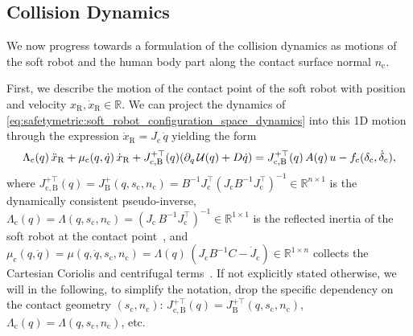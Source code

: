\subsection{Collision Dynamics}
We now progress towards a formulation of the collision dynamics as motions of the soft robot and the human body part along the contact surface normal $n_\mathrm{c}$.

First, we describe the motion of the contact point of the soft robot with position and velocity $x_\mathrm{R}, \dot{x}_\mathrm{R} \in \mathbb{R}$.
We can project the dynamics of \eqref{eq:safetymetric:soft_robot_configuration_space_dynamics} into this 1D motion through the expression $\dot{x}_\mathrm{R} = J_\mathrm{c} \, \dot{q}$ yielding the form~\citep{khatib1987unified, della2019exact, della2020model, stolzle2024guiding}
\begin{equation}
    \Lambda_\mathrm{c}(q) \, \Ddot{x}_\mathrm{R} + \mu_\mathrm{c}(q,\dot{q}) \, \dot{x}_\mathrm{R} + J_\mathrm{c,B}^{+\top}(q) ( \partial_{q} \, \mathcal{U}(q) + D \dot{q} ) = J_\mathrm{c,B}^{+\top}(q) \, A(q) \, u - f_{\mathrm{c}}(\delta_\mathrm{c}, \dot{\delta}_\mathrm{c}),
\end{equation}
where $J_\mathrm{c,B}^{+\top}(q) = J_\mathrm{B}^+(q,s_\mathrm{c},n_\mathrm{c}) = B^{-1}J_\mathrm{c}^\top(J_\mathrm{c} B^{-1} J_\mathrm{c}^\top)^{-1} \in \mathbb{R}^{n \times 1}$ is the dynamically consistent pseudo-inverse, $\Lambda_\mathrm{c}(q) = \Lambda(q,s_\mathrm{c},n_\mathrm{c}) = (J_\mathrm{c} \, B^{-1} J_\mathrm{c}^\top)^{-1} \in \mathbb{R}^{1 \times 1}$ is the reflected inertia of the soft robot at the contact point~\citep{haddadin2009requirements, iso2016collaborative}, and $\mu_\mathrm{c}(q,\dot{q}) = \mu(q, \dot{q},s_\mathrm{c},n_\mathrm{c}) = \Lambda(q) \, (J_\mathrm{c} B^{-1} C - \dot{J}_\mathrm{c}) \in \mathbb{R}^{1 \times n}$ collects the Cartesian Coriolis and centrifugal terms~\citep{khatib1987unified}.
If not explicitly stated otherwise, we will in the following, to simplify the notation, drop the specific dependency on the contact geometry $(s_\mathrm{c}, n_\mathrm{c})$: $J_\mathrm{c,B}^{+\top}(q) = J_\mathrm{B}^{+\top}(q,s_\mathrm{c},n_\mathrm{c})$, $\Lambda_\mathrm{c}(q) = \Lambda(q,s_\mathrm{c},n_\mathrm{c})$, etc.

